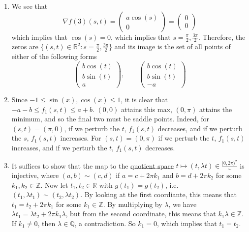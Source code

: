 \begin{solution}
\begin{enumerate}
			\item We see that 
				\begin{equation}
					\nabla f(3) (s, t) = \begin{pmatrix} a \cos(s) \\ 0 \end{pmatrix} = \begin{pmatrix} 0 \\ 0 \end{pmatrix} 
				\end{equation}
				which implies that $\cos(s) = 0$, which implies that $s = \frac{\pi}{2}, \frac{3\pi}{2}$. Therefore, the zeros are $\{(s, t) \in \mathbb{R}^2 \colon s = \frac{\pi}{2}, \frac{3\pi}{2} \}$ and its image is the set of all points of either of the following forms
				\begin{equation}
					\begin{pmatrix} b \cos(t) \\ b \sin(t) \\ a \end{pmatrix}, \qquad \begin{pmatrix} b \cos(t) \\ b \sin(t) \\ -a \end{pmatrix}
				\end{equation} 

			\item Since $-1 \leq \sin(x), \cos(x) \leq 1$, it is clear that $-a - b \leq f_1 (s, t) \leq a + b$. $(0, 0)$ attains this max, $(0, \pi)$ attains the minimum, and so the final two must be saddle points. Indeed, for $(s, t) = (\pi, 0)$, if we perturb the $t$, $f_1 (s, t)$ decreases, and if we perturb the $s$, $f_1 (s, t)$ increases. For $(s, t) = (0, \pi)$ if we perturb the $t$, $f_1 (s, t)$ increases, and if we perturb the $t$, $f_1(s, t)$ decreases. 

			\item It suffices to show that the map to the \hyperref[pst-def:quotient-topology]{quotient space} $t \mapsto (t, \lambda t) \in \frac{[0, 2\pi)^2}{\sim}$ is injective, where $(a, b) \sim (c, d)$ if $a = c + 2 \pi k_1$ and $b = d + 2 \pi k_2$ for some $k_1, k_2 \in \mathbb{Z}$. Now let $t_1, t_2 \in \mathbb{R}$ with $g(t_1) = g(t_2)$, i.e. $(t_1, \lambda t_1) \sim (t_2, \lambda t_2)$. By looking at the first coordiante, this means that $t_1 = t_2 + 2 \pi k_1$ for some $k_1 \in \mathbb{Z}$. By multiplying by $\lambda$, we have $\lambda t_1 = \lambda t_2 + 2 \pi k_1 \lambda$, but from the second coordinate, this means that $k_1 \lambda \in \mathbb{Z}$. If $k_1 \neq 0$, then $\lambda \in \mathbb{Q}$, a contradiction. So $k_1 = 0$, which implies that $t_1 = t_2$. 


\end{enumerate}
\end{solution}
